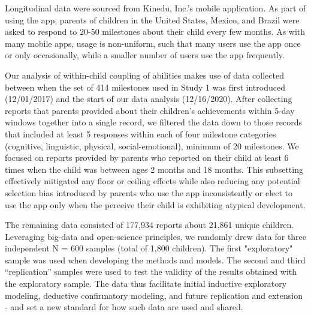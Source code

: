 \documentclass[man, floatsintext]{apa7}
\begin{document}
Longitudinal data were sourced from Kinedu, Inc.'s mobile application. As part of using the app, parents of children in the United States, Mexico, and Brazil were asked to
respond to 20-50 milestones about their child every few months. As with
many mobile apps, usage is non-uniform, such that many users use the app
once or only occasionally, while a smaller number of users use the app frequently. 


Our analysis of within-child coupling of abilities makes use of data collected between
when the set of 414 milestones used in Study 1 was first introduced (12/01/2017) and the start
of our data analysis (12/16/2020). After collecting reports that parents provided about their children's achievements within 5-day windows together into a single record, we filtered the data down to those records that included at least 5
responses within each of four milestone categories (cognitive, linguistic, physical,
social-emotional), minimum of 20 milestones. We focused on reports provided by parents who reported on their child at least 6 times when the child was between ages 2 months and 18 months. This subsetting effectively mitigated any floor or ceiling effects while also reducing any potential selection bias introduced by parents who use the app inconsistently or elect to use the app only when the perceive their child is exhibiting atypical development. 

The remaining data consisted of 177,934 reports about 21,861 unique children. Leveraging big-data and open-science principles, we randomly drew data for three independent N = 600 samples (total of 1,800 children). The first "exploratory" sample was used when developing the methods and models. The second and third ``replication'' samples were used to test the validity of the results obtained with the exploratory sample. The data thus facilitate initial inductive exploratory modeling, deductive confirmatory modeling, and future replication and extension - and set a new standard for how such data are used and shared. 
\end{document}
